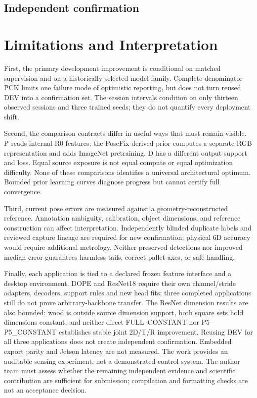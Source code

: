 \documentclass[journal]{IEEEtran}
\begin{document}
\subsection{Independent confirmation}


\section{Limitations and Interpretation}
First, the primary development improvement is conditional on matched supervision and on a historically selected model family. Complete-denominator PCK limits one failure mode of optimistic reporting, but does not turn reused DEV into a confirmation set. The session intervals condition on only thirteen observed sessions and three trained seeds; they do not quantify every deployment shift.

Second, the comparison contracts differ in useful ways that must remain visible. P reads internal R0 features; the PoseFix-derived prior computes a separate RGB representation and adds ImageNet pretraining. D has a different output support and loss. Equal source exposure is not equal compute or equal optimization difficulty. None of these comparisons identifies a universal architectural optimum. Bounded prior learning curves diagnose progress but cannot certify full convergence.

Third, current pose errors are measured against a geometry-reconstructed reference. Annotation ambiguity, calibration, object dimensions, and reference construction can affect interpretation. Independently blinded duplicate labels and reviewed capture lineage are required for new confirmation; physical 6D accuracy would require additional metrology. Neither preserved detections nor improved median error guarantees harmless tails, correct pallet axes, or safe handling.

Finally, each application is tied to a declared frozen feature interface and a desktop environment. DOPE and ResNet18 require their own channel/stride adapters, decoders, support rules and new head fits; three completed applications still do not prove arbitrary-backbone transfer. The ResNet dimension results are also bounded: wood is outside source dimension support, both square sets hold dimensions constant, and neither direct FULL--CONSTANT nor P5--P5\_CONSTANT establishes stable joint 2D/T/R improvement. Reusing DEV for all three applications does not create independent confirmation. Embedded export parity and Jetson latency are not measured. The work provides an auditable sensing experiment, not a demonstrated control system. The author team must assess whether the remaining independent evidence and scientific contribution are sufficient for submission; compilation and formatting checks are not an acceptance decision.
\end{document}
